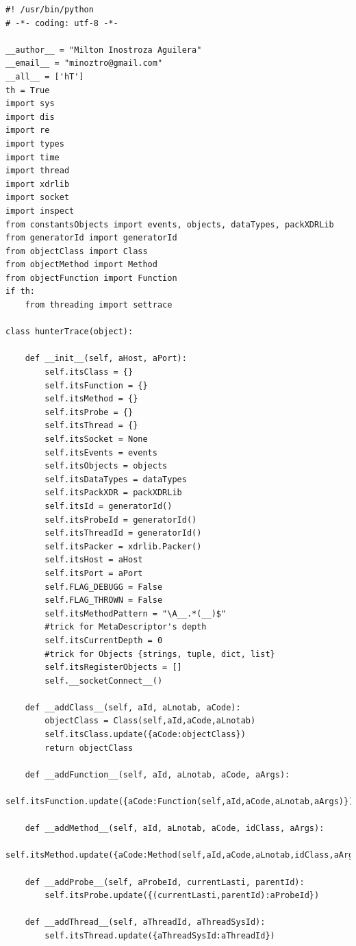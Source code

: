 \documentclass[12pt,legalpaper]{report}
\begin{document}
\begin{singlespace}
\begin{lstlisting}[style=Python]
#! /usr/bin/python
# -*- coding: utf-8 -*-

__author__ = "Milton Inostroza Aguilera"
__email__ = "minoztro@gmail.com"
__all__ = ['hT']
th = True
import sys
import dis
import re
import types
import time
import thread
import xdrlib
import socket
import inspect
from constantsObjects import events, objects, dataTypes, packXDRLib
from generatorId import generatorId
from objectClass import Class
from objectMethod import Method
from objectFunction import Function
if th:
    from threading import settrace   

class hunterTrace(object):

    def __init__(self, aHost, aPort):
        self.itsClass = {}
        self.itsFunction = {}
        self.itsMethod = {}
        self.itsProbe = {}
        self.itsThread = {}
        self.itsSocket = None
        self.itsEvents = events
        self.itsObjects = objects
        self.itsDataTypes = dataTypes
        self.itsPackXDR = packXDRLib
        self.itsId = generatorId()
        self.itsProbeId = generatorId()
        self.itsThreadId = generatorId()
        self.itsPacker = xdrlib.Packer()
        self.itsHost = aHost
        self.itsPort = aPort
        self.FLAG_DEBUGG = False
        self.FLAG_THROWN = False
        self.itsMethodPattern = "\A__.*(__)$"
        #trick for MetaDescriptor's depth
        self.itsCurrentDepth = 0
        #trick for Objects {strings, tuple, dict, list}
        self.itsRegisterObjects = []
        self.__socketConnect__()

    def __addClass__(self, aId, aLnotab, aCode):
        objectClass = Class(self,aId,aCode,aLnotab)
        self.itsClass.update({aCode:objectClass})
        return objectClass

    def __addFunction__(self, aId, aLnotab, aCode, aArgs):
        self.itsFunction.update({aCode:Function(self,aId,aCode,aLnotab,aArgs)})

    def __addMethod__(self, aId, aLnotab, aCode, idClass, aArgs):
        self.itsMethod.update({aCode:Method(self,aId,aCode,aLnotab,idClass,aArgs)})

    def __addProbe__(self, aProbeId, currentLasti, parentId):
        self.itsProbe.update({(currentLasti,parentId):aProbeId})

    def __addThread__(self, aThreadId, aThreadSysId):
        self.itsThread.update({aThreadSysId:aThreadId})
                

\end{lstlisting}
\end{singlespace}
\end{document}
